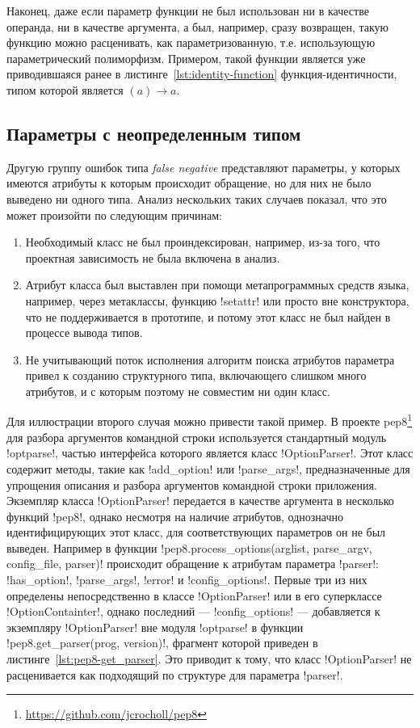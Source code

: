 Наконец, даже если параметр функции не был использован ни в качестве операнда,
ни в качестве аргумента, а был, например, сразу возвращен, такую функцию можно
расценивать, как параметризованную, т.е. использующую параметрический
полиморфизм. Примером, такой функции является уже приводившаяся ранее в
листинге~\ref{lst:identity-function} функция-идентичности, типом которой
является $(a) \rightarrow a$.

\subsection{Параметры с неопределенным типом}
\label{sub:undefined-type-parameters}

Другую группу ошибок типа \emph{false negative} представляют параметры, у которых
имеются атрибуты к которым происходит обращение, но для них не было выведено ни
одного типа. Анализ нескольких таких случаев показал, что это может произойти по
следующим причинам:

\begin{enumerate}
    \item Необходимый класс не был проиндексирован, например, из-за того, что
      проектная зависимость не была включена в анализ.

    \item Атрибут класса был выставлен при помощи метапрограммных средств языка,
      например, через метаклассы, функцию !setattr! или просто
      вне конструктора, что не поддерживается в прототипе, и потому этот класс не был
      найден в процессе вывода типов.

    \item Не учитывающий поток исполнения алгоритм поиска атрибутов параметра
      привел к созданию структурного типа, включающего слишком много
      атрибутов, и с которым поэтому не совместим ни один класс.

\end{enumerate}

Для иллюстрации второго случая можно привести такой пример. В проекте
pep8\footnote{\url{https://github.com/jcrocholl/pep8}} для разбора аргументов
командной строки используется стандартный модуль !optparse!, частью интерфейса
которого является класс !OptionParser!. Этот класс содержит методы, такие как
!add_option! или !parse_args!, 
предназначенные для упрощения описания и разбора аргументов командной строки
приложения. Экземпляр класса !OptionParser! передается в качестве аргумента в
несколько функций !pep8!, однако несмотря на наличие атрибутов, однозначно
идентифицирующих этот класс, для соответствующих параметров он не был выведен.
Например в функции !pep8.process_options(arglist, parse_argv, config_file, parser)!
происходит обращение к атрибутам параметра
!parser!: !has_option!, !parse_args!, !error! и !config_options!. Первые три из
них определены непосредственно в классе !OptionParser! или в его суперклассе
!OptionContainter!, однако последний --- !config_options! --- добавляется к
экземпляру !OptionParser! вне модуля !optparse! в функции
!pep8.get_parser(prog, version)!, фрагмент которой приведен в
листинге~\ref{lst:pep8-get_parser}. Это приводит к тому, что класс
!OptionParser! не расценивается как подходящий по структуре для параметра
!parser!.

